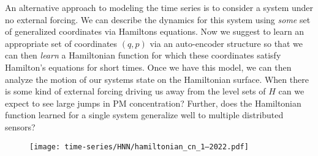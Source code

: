 An alternative approach to modeling the time series is to consider a system under no external forcing. We can describe the dynamics for this system using \textit{some} set of generalized coordinates via Hamiltons equations. Now we suggest to learn an appropriate set of coordinates $(q,p)$ via an auto-encoder structure so that we can then \textit{learn} a Hamiltonian function for which these coordinates satisfy Hamilton's equations for short times. Once we have this model, we can then analyze the motion of our systems state on the Hamiltonian surface. When there is some kind of external forcing driving us away from the level sets of $H$ can we expect to see large jumps in PM concentration? Further, does the Hamiltonian function learned for a single system generalize well to multiple distributed sensors? 

\begin{figure}[h]
  \centering
  \texttt{[image: time-series/HNN/hamiltonian\_cn\_1--2022.pdf]}
\end{figure}








